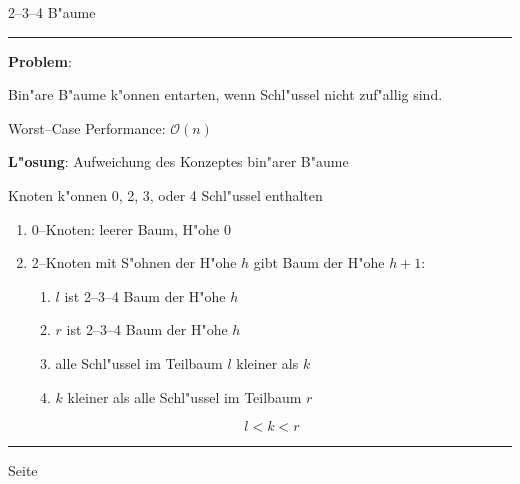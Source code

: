 \documentclass{slides}
\newcommand{\Oh}{\mathcal{O}}
\newcounter{mypage}
\begin{document}
\begin{center}
2--3--4 B"aume
\end{center}

\rule{17cm}{1mm}

\footnotesize
\textbf{Problem}: 

 Bin"are B"aume k"onnen entarten, wenn Schl"ussel nicht zuf"allig sind.

      Worst--Case Performance: $\Oh(n)$

\textbf{L"osung}: Aufweichung des Konzeptes bin"arer B"aume

 Knoten k"onnen 0, 2, 3, oder 4 Schl"ussel enthalten

\begin{enumerate}
\item 0--Knoten: leerer Baum, H"ohe 0

\item 2--Knoten mit S"ohnen der H"ohe $h$ gibt Baum der H"ohe $h+1$:

\hspace*{3cm} 
\begin{enumerate}
\item $l$ ist 2--3--4 Baum der H"ohe $h$
\item $r$ ist 2--3--4 Baum der H"ohe $h$
\item alle Schl"ussel im Teilbaum $l$ kleiner als $k$
\item $k$ kleiner als alle Schl"ussel im Teilbaum $r$ 
\end{enumerate}
 $$ l < k < r $$

\end{enumerate}

\vspace*{0.2cm}

\scriptsize

\vspace*{\fill}
\tiny \addtocounter{mypage}{1}
\rule{17cm}{1mm}
  \hspace*{\fill} Seite 


\end{document}
